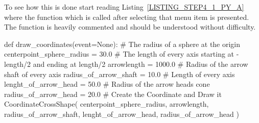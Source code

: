 To see how this is done start reading Listing~\ref{LISTING_STEP4_1_PY_A} where the function which is called after selecting that menu item is presented.
The function is heavily commented and should be understood without difficulty.
%
\begin{python}[moreemph={[4], 46, 48},caption={Step4\_1.py - Drawing a larger, coloured coordinate system -- function {\tt draw\_coordinates} which is called by clicking on the menu},label=LISTING_STEP4_1_PY_A]
def draw_coordinates(event=None):
    # The radius of a sphere at the origin
    centerpoint_sphere_radius = 30.0
    # The length of every axis starting at -length/2 and ending at length/2
    arrowlength = 1000.0
    # Radius of the arrow shaft of every axis
    radius_of_arrow_shaft = 10.0
    # Length of every axis
    lenght_of_arrow_head = 50.0
    # Radius of the arrow heads cone
    radius_of_arrow_head = 20.0
    # Create the Coordinate and Draw it
    CoordinateCrossShape(   centerpoint_sphere_radius,
                            arrowlength,
                            radius_of_arrow_shaft,
                            lenght_of_arrow_head,
                            radius_of_arrow_head )
\end{python}

